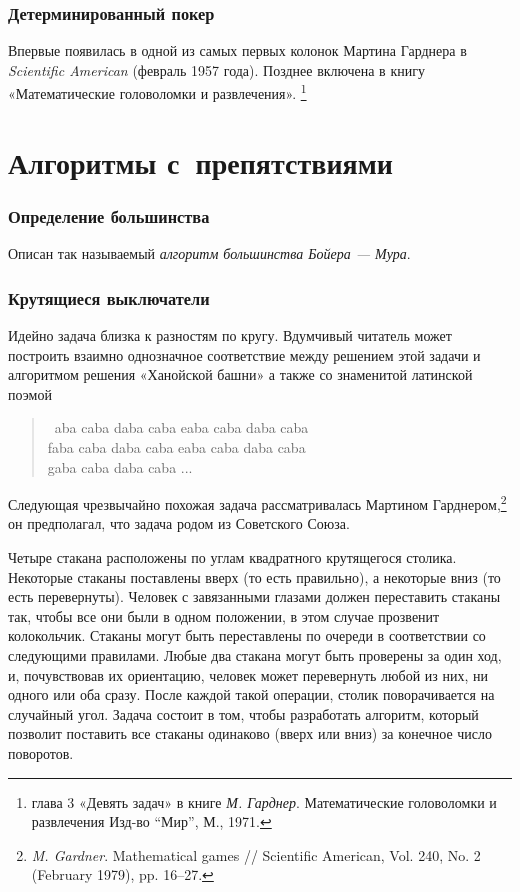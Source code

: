 \documentclass[twoside]{book}
\begin{document}
\subsubsection{Детерминированный покер}
Впервые появилась в одной из самых первых колонок Мартина Гарднера в \emph{Scientific American} (февраль 1957 года).
Позднее включена в книгу «Математические головоломки и развлечения».%
\footnote{глава 3 «Девять задач» в книге \emph{М. Гарднер}.  Математические головоломки и развлечения Изд-во ``Мир'', М., 1971.}

\section{Алгоритмы с~препятствиями}

\subsubsection*{Определение большинства}
Описан так называемый \emph{алгоритм большинства Бойера --- Мура}. 


\subsubsection*{Крутящиеся выключатели}
Идейно задача близка к разностям по кругу.
Вдумчивый читатель может построить взаимно однозначное соответствие между решением этой задачи и алгоритмом решения «Ханойской башни» а также со знаменитой латинской поэмой
\begin{verse}
\ aba caba daba caba eaba caba daba caba\\
faba caba daba caba eaba caba daba caba\\
gaba caba daba caba ...
\end{verse}


Следующая чрезвычайно похожая задача рассматривалась Мартином Гарднером,\footnote{
\emph{M. Gardner}.
Mathematical games /\!/ Scientific American, Vol. 240, No. 2 (February 1979), pp. 16--27.}
он предполагал, что задача родом из Советского Союза. 

Четыре стакана расположены по углам квадратного крутящегося столика.
Некоторые стаканы поставлены вверх (то есть правильно), а некоторые вниз (то есть перевернуты). Человек с завязанными глазами должен переставить стаканы так, чтобы все они были в одном положении, в этом случае прозвенит колокольчик.
Стаканы могут быть переставлены по очереди в соответствии со следующими правилами.
Любые два стакана могут быть проверены за один ход, и, почувствовав их ориентацию, человек может перевернуть любой из них, ни одного или оба сразу.
После каждой такой операции, столик поворачивается на случайный угол.
Задача состоит в том, чтобы разработать алгоритм, который позволит 
поставить все стаканы одинаково (вверх или вниз) за конечное число поворотов.
\end{document}
